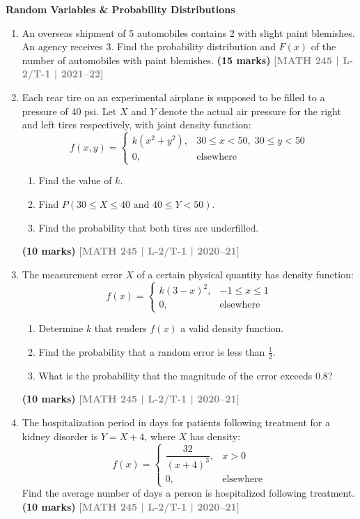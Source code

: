 \documentclass[12pt,a4paper]{article}
\newcommand{\yr}[1]{\hfill\textcolor{gray}{\small\textbf{[#1]}}}
\newcommand{\mk}[1]{\textcolor{orange!70!black}{\small\textbf{(#1 marks)}}}
\newcommand{\subtopic}[2]{%
  \vspace{10pt}
  \noindent\begin{tcolorbox}[colback=#1!8,colframe=#1,boxrule=0.6pt,arc=4pt,
    left=6pt,right=6pt,top=4pt,bottom=4pt]
    \small\bfseries\textcolor{#1}{#2}
  \end{tcolorbox}
  \vspace{2pt}
}
\begin{document}
\subtopic{cG}{Random Variables \& Probability Distributions}
\label{sub:s8-rv}

\begin{enumerate}\item An overseas shipment of 5 automobiles contains 2 with slight paint blemishes. An agency receives 3. Find the probability distribution and $F(x)$ of the number of automobiles with paint blemishes.
\mk{15} \yr{MATH 245 | L-2/T-1 | 2021--22}

\item Each rear tire on an experimental airplane is supposed to be filled to a pressure of 40 psi. Let $X$ and $Y$ denote the actual air pressure for the right and left tires respectively, with joint density function:
\[
f(x,y) = \begin{cases} k(x^{2}+y^{2}), & 30 \le x < 50,\; 30 \le y < 50 \\ 0, & \text{elsewhere} \end{cases}
\]
\begin{enumerate}
  \item Find the value of $k$.
  \item Find $P(30 \le X \le 40 \text{ and } 40 \le Y < 50)$.
  \item Find the probability that both tires are underfilled.
\end{enumerate}
\mk{10} \yr{MATH 245 | L-2/T-1 | 2020--21}

\item The measurement error $X$ of a certain physical quantity has density function:
\[
f(x) = \begin{cases} k(3-x)^{2}, & -1 \le x \le 1 \\ 0, & \text{elsewhere} \end{cases}
\]
\begin{enumerate}
  \item Determine $k$ that renders $f(x)$ a valid density function.
  \item Find the probability that a random error is less than $\tfrac{1}{2}$.
  \item What is the probability that the magnitude of the error exceeds $0.8$?
\end{enumerate}
\mk{10} \yr{MATH 245 | L-2/T-1 | 2020--21}

\item The hospitalization period in days for patients following treatment for a kidney disorder is $Y=X+4$, where $X$ has density:
\[
f(x) = \begin{cases} \dfrac{32}{(x+4)^{3}}, & x > 0 \\ 0, & \text{elsewhere} \end{cases}
\]
Find the average number of days a person is hospitalized following treatment.
\mk{10} \yr{MATH 245 | L-2/T-1 | 2020--21}


\end{enumerate}
\end{document}
